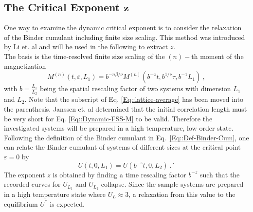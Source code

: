 	\subsection{The Critical Exponent $\boldsymbol{z}$}
	One way to examine the dynamic critical exponent is to consider the relaxation of the Binder cumulant including finite size scaling. This method was introduced by Li et. al \cite{li1995dynamic} and will be used in the following to extract $z$. \\
	
	The basis is the time-resolved finite size scaling of the $(n)-$th moment of the magnetization \cite{li1995dynamic}
	\begin{equation} \label{Eq::Dynamic-FSS-M}
		M^{(n)}(t, \varepsilon, L_1) = b^{-n \beta / \nu} M^{(n)}(b^{-z}t, b^{1 /	\nu} \tau, b^{-1} L_1) ~,
	\end{equation}
	with $b =	\tfrac{L_1}{L_2}$ being the spatial rescaling factor of two systems with dimension $L_1$ and $L_2$. Note that the subscript of Eq. \eqref{Eq::lattice-average} has been moved into the parenthesis. Janssen et. al \cite{janssen1989new} determined that the initial correlation length must be very short for Eq. \eqref{Eq::Dynamic-FSS-M} to be valid. Therefore the investigated systems will be prepared in a high temperature, low order state.
	Following the definition of the Binder cumulant in Eq.~\eqref{Eq::Def-Binder-Cum}, one can relate the Binder cumulant of systems of different sizes at the critical point $\varepsilon =	0$ by
	\begin{equation}
		U(t, 0, L_1) =	U(b^{-z} t, 0, L_2)~.´
	\end{equation}
	The exponent $z$ is obtained by finding a time rescaling factor $b^{-z}$ such that the recorded curves for $U_{L_1}$ and $U_{L_2}$ collapse. Since the sample systems are prepared in a high temperature state where $U_L \approx	3$, a relaxation from this value to the equilibrium $U^*$ is expected.
